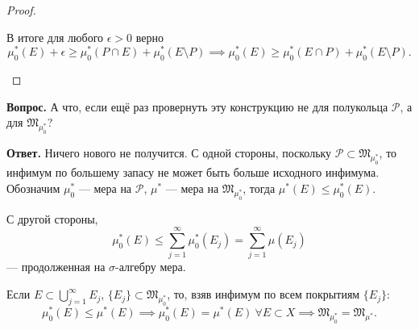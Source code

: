\begin{proof}
\begin{enumerate}
        В итоге для любого $\epsilon > 0$ верно
        \[\mu_0^*(E) + \epsilon \geqslant \mu_0^*(P \cap E) + \mu_0^*(E \setminus P) \implies \mu_0^*(E) \geqslant \mu_0^*(E \cap P) + \mu_0^*(E \setminus P).\]
    \end{enumerate}
\end{proof} 

\noindent \textbf{Вопрос.} А что, если ещё раз провернуть эту конструкцию не для полукольца $\mathcal{P}$, а для $\mathfrak{M}_{\mu_0^*}$?

\noindent \textbf{Ответ.} Ничего нового не получится.
С одной стороны, поскольку $\mathcal{P} \subset \mathfrak{M}_{\mu_0^*}$, то инфимум по большему запасу не может быть больше исходного инфимума.
Обозначим $\mu_0^*$ — мера на $\mathcal{P}$, $\mu^*$ — мера на $\mathfrak{M}_{\mu_0^*}$, тогда $\mu^* (E) \leqslant \mu_0^*(E)$.

С другой стороны,
\[\mu_0^*(E) \leqslant \sum\limits_{j=1}^{\infty} \mu_0^*(E_j) = \sum\limits_{j=1}^{\infty} \mu(E_j)\]
— продолженная на $\sigma$-алгебру мера.

\noindent Если $E \subset \bigcup\limits_{j=1}^{\infty} E_j$, $\{E_j\} \subset \mathfrak{M}_{\mu_0^*}$, то, взяв инфимум по всем покрытиям $\{E_j\}$:
\[\mu_0^*(E) \leqslant \mu^*(E) \implies \mu_0^*(E) = \mu^*(E) \ \forall E \subset X \implies \mathfrak{M}_{\mu_0^*} = \mathfrak{M}_{\mu^*}.\]

